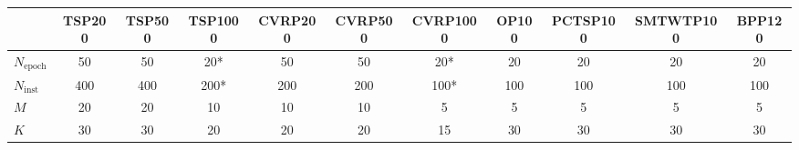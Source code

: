 \begin{tabular}{l|ccc|ccc|c|c|c|c}
\toprule
 & TSP200 & TSP500 & TSP1000 & CVRP200 & CVRP500 & CVRP1000 & OP100 & PCTSP100 & SMTWTP100 & BPP120 \\
\midrule
$N_{\text{epoch}}$ & 50 & 50 & 20* & 50 & 50 & 20* & 20 & 20 & 20 & 20 \\
$N_{\text{inst}}$ & 400 & 400 & 200* & 200 & 200 & 100* & 100 & 100 & 100 & 100\\
$M$ & 20 & 20 & 10 & 10 & 10 & 5 & 5 & 5 & 5 & 5 \\
$K$ & 30 & 30 & 20 & 20 & 20 & 15 & 30 & 30 & 30 & 30 \\
\bottomrule
\end{tabular}